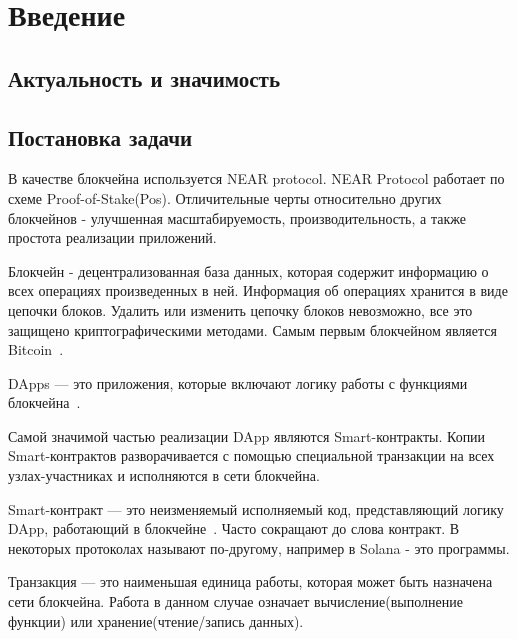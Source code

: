 \section{Введение}
\subsection{Актуальность и значимость}

\subsection{Постановка задачи}
В качестве блокчейна используется NEAR protocol\cite{nearprotocol_2022}. NEAR Protocol работает по схеме Proof-of-Stake(Pos). Отличительные черты относительно других блокчейнов - улучшенная масштабируемость, производительность, а также простота реализации приложений.

\begin{definition}
    Блокчейн - децентрализованная база данных, которая содержит информацию о всех операциях произведенных в ней.
    Информация об операциях хранится в виде цепочки блоков.  Удалить или изменить цепочку блоков невозможно, все это защищено криптографическими методами. Самым первым блокчейном является Bitcoin~\cite{nakamoto2012bitcoin}.
\end{definition}

\begin{definition}
    DApps --- это приложения, которые включают логику работы с функциями блокчейна~\cite{ramamurthy2020blockchain}.
\end{definition}

Самой значимой частью реализации DApp являются Smart-контракты. Копии Smart-контрактов разворачивается с помощью специальной транзакции на всех узлах-участниках и исполняются в сети блокчейна.

\begin{definition}
    Smart-контракт --- это неизменяемый исполняемый код, представляющий логику DApp, работающий в блокчейне~\cite{ramamurthy2020blockchain}. Часто сокращают до слова контракт. В некоторых протоколах называют по-другому, например в Solana - это программы\cite{solanaprogramlibrarydocs}.
\end{definition}

\begin{definition}
    Транзакция — это наименьшая единица работы, которая может быть назначена сети блокчейна. Работа в данном случае означает вычисление(выполнение функции) или хранение(чтение/запись данных)\cite{neardocumentationtransaction}.
\end{definition}

